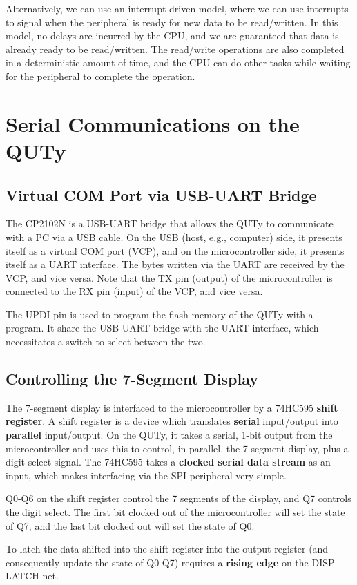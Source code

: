 \documentclass[a4paper]{report}
\begin{document}
Alternatively, we can use an interrupt-driven model, where we can use interrupts to signal when the peripheral is ready for
new data to be read/written. In this model, no delays are incurred by the CPU, and we are guaranteed that data is already ready to be read/written.
The read/write operations are also completed in a deterministic amount of time, and the CPU can do other tasks while waiting for the peripheral to complete the operation.
\section{Serial Communications on the QUTy}
\subsection{Virtual COM Port via USB-UART Bridge}
The CP2102N is a USB-UART bridge that allows the QUTy to communicate with a PC via a USB cable. On the USB (host, e.g., computer) side, it presents itself as a virtual COM port (VCP),
and on the microcontroller side, it presents itself as a UART interface.
The bytes written via the UART are received by the VCP, and vice versa. Note that the TX pin (output) of the microcontroller is connected to the RX pin (input) of the VCP, and vice versa.

The UPDI pin is used to program the flash memory of the QUTy with a program. It share the USB-UART bridge with the UART interface, which necessitates a switch to select between the two.
\subsection{Controlling the 7-Segment Display}
The 7-segment display is interfaced to the microcontroller by a 74HC595 \textbf{shift register}.
A shift register is a device which translates \textbf{serial} input/output into \textbf{parallel} input/output.
On the QUTy, it takes a serial, 1-bit output from the microcontroller and uses this to control, in parallel, the 7-segment display, plus a digit select signal.
The 74HC595 takes a \textbf{clocked serial data stream} as an input, which makes interfacing via the SPI peripheral very simple.

Q0-Q6 on the shift register control the 7 segments of the display, and Q7 controls the digit select.
The first bit clocked out of the microcontroller will set the state of Q7, and the last bit clocked out will set the state of Q0.

To latch the data shifted into the shift register into the output register (and consequently update the state of Q0-Q7) requires a \textbf{rising edge} on the DISP LATCH net.
\end{document}
